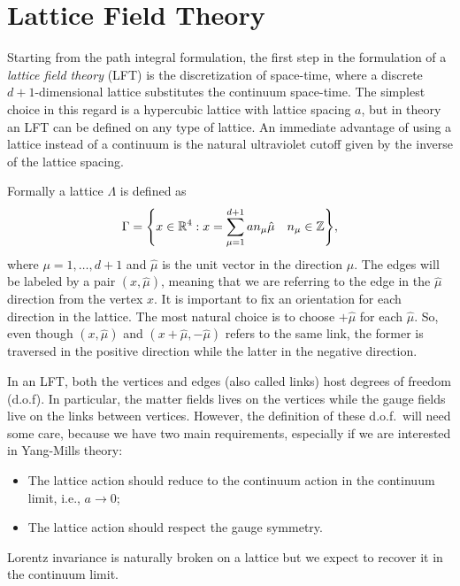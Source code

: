 \section{Lattice Field Theory}
\label{sec:lattice_field_theory}

Starting from the path integral formulation, the first step in the formulation of a \emph{lattice field theory} (LFT) is the discretization of space-time, where a discrete $d+1$-dimensional lattice substitutes the continuum space-time.
The simplest choice in this regard is a hypercubic lattice with lattice spacing $a$, but in theory an LFT can be defined on any type of lattice.
An immediate advantage of using a lattice instead of a continuum is the natural ultraviolet cutoff given by the inverse of the lattice spacing.

Formally a lattice $\Lambda$ is defined as
\begin{equation}
    \Gamma = \qty{
        x \in \mathbb{R}^4 :
        x = \sum_{\mu = 1}^{d+1} a n_{\mu} \hat{\mu} \quad
        n_{\mu} \in \mathbb{Z}},
\end{equation}
where $\mu = 1, \dots, d+1$ and $\hat{\mu}$ is the unit vector in the direction $\mu$.
The edges will be labeled by a pair $(x,\hat{\mu})$, meaning that we are referring to the edge in the $\hat{\mu}$ direction from the vertex $x$.
It is important to fix an orientation for each direction in the lattice.
The most natural choice is to choose $+ \hat{\mu}$ for each $\hat{\mu}$.
So, even though $(x,\hat{\mu})$ and $(x + \hat{\mu}, - \hat{\mu})$ refers to the same link, the former is traversed in the positive direction while the latter in the negative direction.

In an LFT, both the vertices and edges (also called links) host degrees of freedom (d.o.f).
In particular, the matter fields lives on the vertices while the gauge fields live on the links between vertices.
However, the definition of these d.o.f.~will need some care, because we have two main requirements, especially if we are interested in Yang-Mills theory:
\begin{itemize}
    \item The lattice action should reduce to the continuum action in the continuum limit, i.e., $a \to 0$;
    \item The lattice action should respect the gauge symmetry.
\end{itemize}
Lorentz invariance is naturally broken on a lattice but we expect to recover it in the continuum limit.


